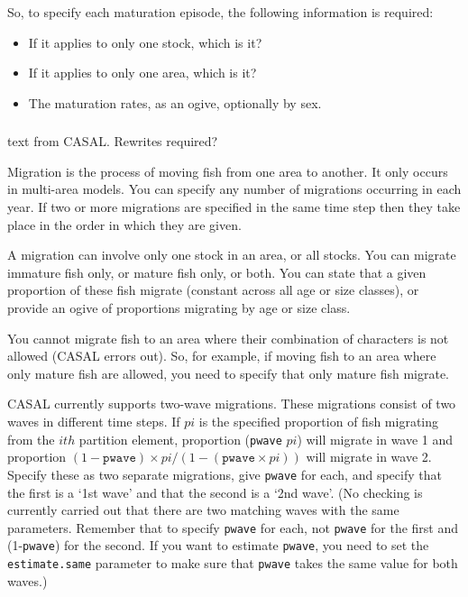 So, to specify each maturation episode, the following information is required: 

\begin{itemize}
\item If it applies to only one stock, which is it?
\item If it applies to only one area, which is it?
\item The maturation rates, as an ogive, optionally by sex.
\end{itemize}




\subsubsection{}
\KL text from CASAL. Rewrites required? \KLend

Migration is the process of moving fish from one area to another. It only occurs in multi-area models. You can specify any number of migrations occurring in each year. If two or more migrations are specified in the same time step then they take place in the order in which they are given.

A migration can involve only one stock in an area, or all stocks. You can migrate immature fish only, or mature fish only, or both. You can state that a given proportion of these fish migrate (constant across all age or size classes), or provide an ogive of proportions migrating by age or size class.

You cannot migrate fish to an area where their combination of characters is not allowed (CASAL errors out). So, for example, if moving fish to an area where only mature fish are allowed, you need to specify that only mature fish migrate.

CASAL currently supports two-wave migrations. These migrations consist of two waves in different time steps. If $pi$ is the specified proportion of fish migrating from the $ith$ partition element, proportion (\texttt{pwave} $pi$) will migrate in wave 1 and proportion $(1 - \texttt{pwave})×pi/(1 - (\texttt{pwave} × pi))$ will migrate in wave 2. Specify these as two separate migrations, give \texttt{pwave} for each, and specify that the first is a `1st wave' and that the second is a `2nd wave'. (No checking is currently carried out that there are two matching waves with the same parameters. Remember that to specify \texttt{pwave} for each, not \texttt{pwave} for the first and (1-\texttt{pwave}) for the second. If you want to estimate \texttt{pwave}, you need to set the \texttt{estimate.same} parameter to make sure that \texttt{pwave} takes the same value for both waves.)


